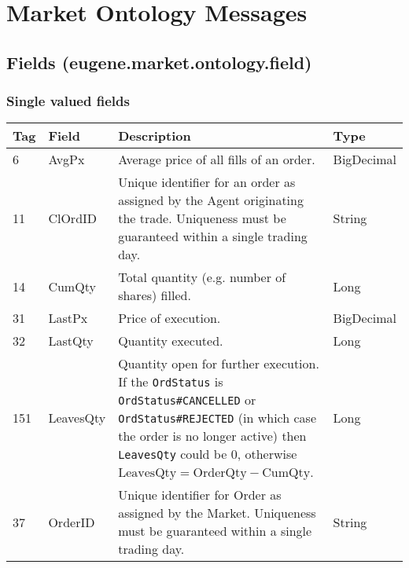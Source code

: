 \chapter{Market Ontology Messages}
\label{Appendix/Market-Ontology}

\section{Fields (eugene.market.ontology.field)}

\subsection{Single valued fields}

\begin{table}[htbp]
\begin{center}
\begin{tabular}{l l p{3.5in} l}

\multicolumn{1}{l}{\textbf{Tag}}            &
\multicolumn{1}{l}{\textbf{Field}}  	    &
\multicolumn{1}{l}{\textbf{Description}}    & 
\multicolumn{1}{l}{\textbf{Type}}		   	\\              
\toprule

6  	& AvgPx  	& Average price of all fills of an order. & BigDecimal \\

11 	& ClOrdID	& Unique identifier for an order as assigned by the Agent originating the trade. Uniqueness must be guaranteed within a single trading day. & String \\

14	& CumQty	& Total quantity (e.g. number of shares) filled. & Long \\

31  & LastPx	& Price of execution.	& BigDecimal \\

32  & LastQty	& Quantity executed.	& Long	     \\

151	& LeavesQty	& Quantity open for further execution. If the \texttt{OrdStatus} is \texttt{OrdStatus\#CANCELLED} or \texttt{OrdStatus\#REJECTED} (in which case the order is no longer active) then \texttt{LeavesQty} could be $0$, otherwise $\mbox{LeavesQty} = \mbox{OrderQty} - \mbox{CumQty}$. & Long \\

37	& OrderID	& Unique identifier for Order as assigned by the Market. Uniqueness must be guaranteed within a single trading day.  & String \\


\end{tabular}
\end{center}
\end{table}

